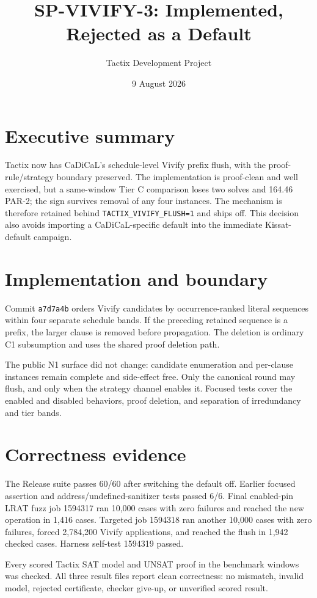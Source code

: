 \documentclass[11pt]{article}
\title{SP-VIVIFY-3: Implemented, Rejected as a Default}
\author{Tactix Development Project}
\date{9 August 2026}
\begin{document}
\maketitle

\section*{Executive summary}
Tactix now has CaDiCaL's schedule-level Vivify prefix flush, with the
proof-rule/strategy boundary preserved.  The implementation is proof-clean and
well exercised, but a same-window Tier C comparison loses two solves and 164.46
PAR-2; the sign survives removal of any four instances.  The mechanism is
therefore retained behind \texttt{TACTIX\_VIVIFY\_FLUSH=1} and ships off.  This
decision also avoids importing a CaDiCaL-specific default into the immediate
Kissat-default campaign.

\section{Implementation and boundary}
Commit \texttt{a7d7a4b} orders Vivify candidates by occurrence-ranked literal
sequences within four separate schedule bands.  If the preceding retained
sequence is a prefix, the larger clause is removed before propagation.  The
deletion is ordinary C1 subsumption and uses the shared proof deletion path.

The public N1 surface did not change: candidate enumeration and per-clause
instances remain complete and side-effect free.  Only the canonical round may
flush, and only when the strategy channel enables it.  Focused tests cover the
enabled and disabled behaviors, proof deletion, and separation of irredundancy
and tier bands.

\section{Correctness evidence}
The Release suite passes 60/60 after switching the default off.  Earlier focused
assertion and address/undefined-sanitizer tests passed 6/6.  Final enabled-pin
LRAT fuzz job 1594317 ran 10,000 cases with zero failures and reached the new
operation in 1,416 cases.  Targeted job 1594318 ran another 10,000 cases with
zero failures, forced 2,784,200 Vivify applications, and reached the flush in
1,942 checked cases.  Harness self-test 1594319 passed.

Every scored Tactix SAT model and UNSAT proof in the benchmark windows was
checked.  All three result files report clean correctness: no mismatch, invalid
model, rejected certificate, checker give-up, or unverified scored result.
\end{document}
